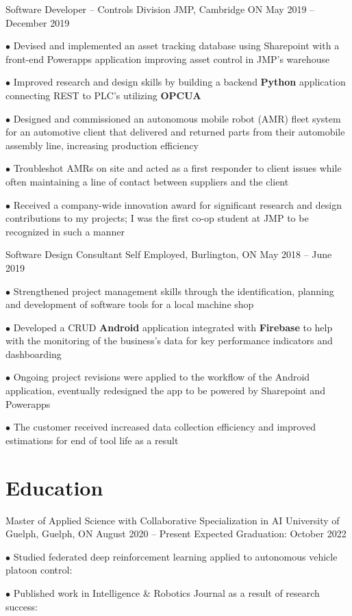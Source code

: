 \documentclass[a4paper,11pt]{article}
\newcommand{\sectionsep}{\vspace{-2.5mm}}
\begin{document}
\resumeExp
{Software Developer -- Controls Division}
{JMP, Cambridge ON}
{May 2019 -- December 2019}
{}
\resumeItemListStart
\item[$\bullet$] Devised and implemented an asset tracking database using Sharepoint with a front-end
Powerapps application improving asset control in JMP's warehouse
\item[$\bullet$] Improved research and design skills by building a backend \textbf{Python} application connecting REST
to PLC's utilizing \textbf{OPCUA}
\item[$\bullet$] Designed and commissioned an autonomous mobile robot (AMR) fleet system for an automotive client that delivered and
returned parts from their automobile assembly line, increasing production efficiency
\item[$\bullet$] Troubleshot AMRs on site and acted as a first responder to client issues while often maintaining a
line of contact between suppliers and the client
\item[$\bullet$] Received a company-wide innovation award for significant research and design contributions to
my projects; I was the first co-op student at JMP to be recognized in such a manner
\resumeItemListEnd

\newpage
\resumeExp
{Software Design Consultant}
{Self Employed, Burlington, ON}
{May 2018 -- June 2019}
{}
\resumeItemListStart
\item[$\bullet$] Strengthened project management skills through the identification, planning and development of
software tools for a local machine shop
\item[$\bullet$] Developed a CRUD \textbf{Android} application integrated with \textbf{Firebase} to help with the monitoring of
the business's data for key performance indicators and dashboarding
\item[$\bullet$] Ongoing project revisions were applied to the workflow of the Android application, eventually
redesigned the app to be powered by Sharepoint and Powerapps
\item[$\bullet$] The customer received increased data collection efficiency and improved estimations for end of
tool life as a result
\resumeItemListEnd

\resumeSubHeadingListEnd
\sectionsep
\section{Education}

\resumeSubHeadingListStart
\resumeEdu
{Master of Applied Science with Collaborative Specialization in AI}
{University of Guelph, Guelph, ON}
{August 2020 -- Present} %
{Expected Graduation: October 2022}
\resumeItemListStart
\item[$\bullet$] Studied federated deep reinforcement learning applied to autonomous vehicle platoon control:
\href{https://atrium.lib.uoguelph.ca/xmlui/handle/10214/27063}{\footnotesize{\faExternalLink}}
\item[$\bullet$] Published work in Intelligence \& Robotics Journal as a result of research success:
\href{https://intellrobot.com/article/view/4885}{\footnotesize{\faExternalLink}}
\resumeItemListEnd
\end{document}
